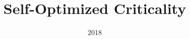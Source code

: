\documentclass{beamer}
\title{Self-Optimized Criticality}
\date{2018}
\begin{document}
\frame{\titlepage}
\end{document}
